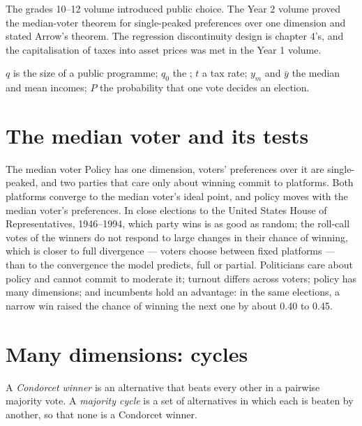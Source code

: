 \begin{recall}
The grades 10--12 volume introduced public choice. The Year 2 volume proved the
median-voter theorem for single-peaked preferences over one dimension and stated
Arrow's theorem. The regression discontinuity design is chapter 4's, and the
capitalisation of taxes into asset prices was met in the Year 1 volume.
\end{recall}

\begin{notation}\label{not:b3:public-choice-voting:symbols}
$q$ is the size of a public programme; $q_0$ the ; $t$ a tax rate; $y_m$ and $\bar y$
the median and mean incomes; $P$ the probability that one vote decides an election.
\end{notation}

\section{The median voter and its tests}\label{sec:b3:public-choice-voting:median}

\begin{model}{The median voter}
\assumes Policy has one dimension, voters' preferences over it are single-peaked,
and two parties that care only about winning commit to platforms.
\predicts Both platforms converge to the median voter's ideal point, and policy
moves with the median voter's preferences.
\tested In close elections to the United States House of Representatives,
1946--1994, which party wins is as good as random; the roll-call votes of the
winners do not respond to large changes in their chance of winning, which is
closer to full divergence --- voters choose between fixed platforms --- than to the
convergence the model predicts, full or partial. %
\breaks Politicians care about policy and cannot commit to moderate it; turnout
differs across voters; policy has many dimensions; and incumbents hold an
advantage: in the same elections, a narrow win raised the chance of winning the
next one by about 0.40 to 0.45. %
\end{model}

\section{Many dimensions: cycles}\label{sec:b3:public-choice-voting:cycles}

\begin{definition}\label{def:b3:public-choice-voting:cycle}
A \emph{Condorcet winner} is an alternative that beats every other in a pairwise
majority vote. A \emph{majority cycle} is a set of alternatives in which each is
beaten by another, so that none is a Condorcet winner.
\end{definition}

